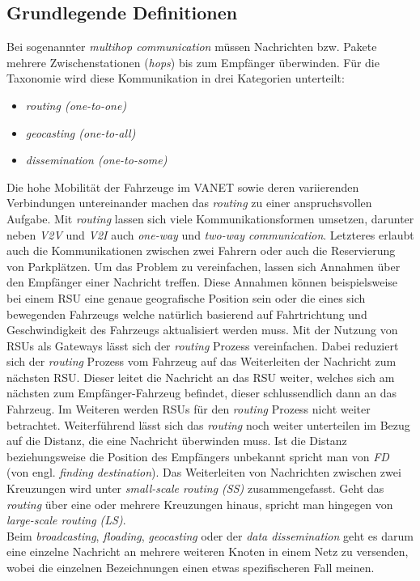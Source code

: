 \documentclass[english,runningheads,a4paper]{llncs}[2018/03/10]
\begin{document}
\subsection{Grundlegende Definitionen}
Bei sogenannter \textit{multihop communication} müssen Nachrichten bzw. Pakete mehrere Zwischenstationen (\textit{hops}) bis zum Empfänger überwinden.
Für die Taxonomie wird diese Kommunikation in drei Kategorien unterteilt:
\begin{itemize}
  \item \textit{routing (one-to-one)}
  \item \textit{geocasting (one-to-all)}
  \item \textit{dissemination (one-to-some)}
\end{itemize}
Die hohe Mobilität der Fahrzeuge im VANET sowie deren variierenden Verbindungen untereinander machen das \textit{routing} zu einer anspruchsvollen Aufgabe.
Mit \textit{routing} lassen sich viele Kommunikationsformen umsetzen, darunter neben \textit{V2V} und \textit{V2I} auch \textit{one-way} und \textit{two-way communication}.
Letzteres erlaubt auch die Kommunikationen zwischen zwei Fahrern oder auch die Reservierung von Parkplätzen.
Um das Problem zu vereinfachen, lassen sich Annahmen über den Empfänger einer Nachricht treffen.
Diese Annahmen können beispielsweise bei einem RSU eine genaue geografische Position sein oder die eines sich bewegenden Fahrzeugs welche natürlich basierend auf Fahrtrichtung und Geschwindigkeit des Fahrzeugs aktualisiert werden muss.
Mit der Nutzung von RSUs als Gateways lässt sich der \textit{routing} Prozess vereinfachen.
Dabei reduziert sich der \textit{routing} Prozess vom Fahrzeug auf das Weiterleiten der Nachricht zum nächsten RSU\@.
Dieser leitet die Nachricht an das RSU weiter, welches sich am nächsten zum Empfänger-Fahrzeug befindet, dieser schlussendlich dann an das Fahrzeug.
Im Weiteren werden RSUs für den \textit{routing} Prozess nicht weiter betrachtet.
Weiterführend lässt sich das \textit{routing} noch weiter unterteilen im Bezug auf die Distanz, die eine Nachricht überwinden muss.
Ist die Distanz beziehungsweise die Position des Empfängers unbekannt spricht man von \textit{FD} (von engl. \textit{finding destination}).
Das Weiterleiten von Nachrichten zwischen zwei Kreuzungen wird unter \textit{small-scale routing (SS)} zusammengefasst.
Geht das \textit{routing} über eine oder mehrere Kreuzungen hinaus, spricht man hingegen von \textit{large-scale routing (LS)}.\\
Beim \textit{broadcasting}, \textit{floading}, \textit{geocasting} oder der \textit{data dissemination} geht es darum eine einzelne Nachricht an mehrere weiteren Knoten in einem Netz zu versenden, wobei die einzelnen Bezeichnungen einen etwas spezifischeren Fall meinen.
\end{document}
